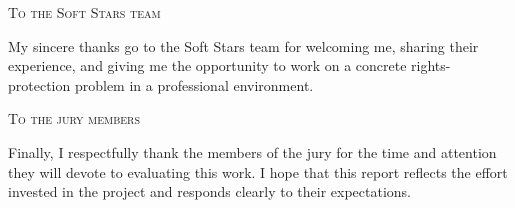 \documentclass[12pt,a4paper,twoside]{report}
\newcommand{\acktitlefont}{\rmfamily}
\newcommand{\acksection}[1]{%
  \vspace{0.44cm}%
  {\acktitlefont\scshape\fontsize{15.8}{19.0}\selectfont #1\par}%
  \vspace{0.07cm}%
}
\newif\ifmainpagination
\begin{document}
\acksection{To the Soft Stars team}
My sincere thanks go to the Soft Stars team for welcoming me, sharing their
experience, and giving me the opportunity to work on a concrete
rights-protection problem in a professional environment.

\acksection{To the jury members}
Finally, I respectfully thank the members of the jury for the time and attention
they will devote to evaluating this work. I hope that this report reflects the
effort invested in the project and responds clearly to their expectations.

\endgroup
\restoregeometry
\clearpage

\tableofcontents
\clearpage
\listoffigures
\clearpage
\listoftables
\clearpage


\clearpage
\mainpaginationtrue
{}







\end{document}
